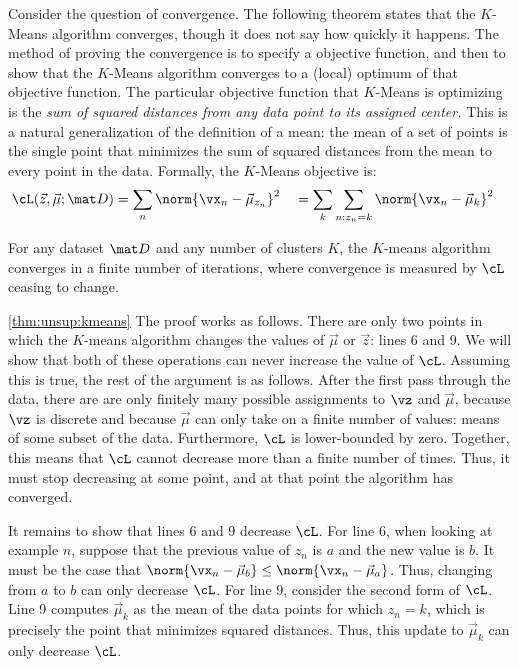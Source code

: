 Consider the question of convergence.  The following theorem states
that the $K$-Means algorithm converges, though it does not say how
quickly it happens.  The method of proving the convergence is to
specify a  objective function, and then to
show that the $K$-Means algorithm converges to a (local) optimum of
that objective function.  The particular objective function that
$K$-Means is optimizing is the \emph{sum of squared distances from any
  data point to its assigned center.}  This is a natural
generalization of the definition of a mean: the mean of a set of
points is the single point that minimizes the sum of squared distances
from the mean to every point in the data.  Formally, the $K$-Means
objective is:
%
\begin{align}
  \cL(\vec z, \vec \mu ; \mat D)
  &=
  \sum_n \norm{ \vx_n - \vec\mu_{z_n} }^2
  \quad
  =
  \sum_k \sum_{n : z_n=k} \norm{ \vx_n - \vec\mu_k }^2
\end{align}
%
\begin{theorem} \label{thm:unsup:kmeans}
  For any dataset $\mat D$ and any number of clusters $K$, the
  $K$-means algorithm converges in a finite number of iterations,
  where convergence is measured by $\cL$ ceasing to change.
\end{theorem}
\begin{myproof}{\ref{thm:unsup:kmeans}}
    The proof works as follows.  There are only two points in which
    the $K$-means algorithm changes the values of $\vec\mu$ or $\vec
    z$: lines 6 and 9.  We will show that both of these operations
    can never increase the value of $\cL$.  Assuming this is true, the
    rest of the argument is as follows.  After the first pass through
    the data, there are are only finitely many possible assignments to
    $\vz$ and $\vec \mu$, because $\vz$ is discrete and because
    $\vec\mu$ can only take on a finite number of values: means of
    some subset of the data.  Furthermore, $\cL$ is lower-bounded by
    zero.  Together, this means that $\cL$ cannot decrease more than a
    finite number of times.  Thus, it must stop decreasing at some
    point, and at that point the algorithm has converged.

    It remains to show that lines 6 and 9 decrease $\cL$.  For line 6,
    when looking at example $n$, suppose that the previous value of
    $z_n$ is $a$ and the new value is $b$.  It must be the case that
    $\norm{\vx_n-\vec\mu_b} \leq \norm{\vx_n-\vec\mu_a}$.  Thus,
    changing from $a$ to $b$ can only decrease $\cL$.  For line 9,
    consider the second form of $\cL$.  Line 9 computes $\vec\mu_k$ as
    the mean of the data points for which $z_n=k$, which is precisely
    the point that minimizes squared distances.  Thus, this update to
    $\vec\mu_k$ can only decrease $\cL$.
\end{myproof}

